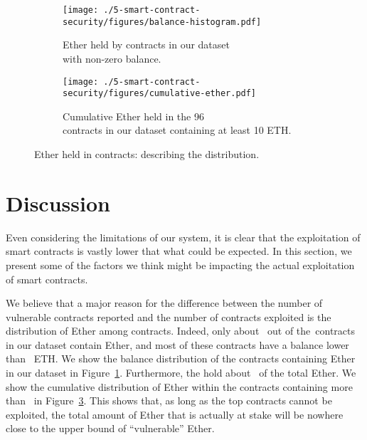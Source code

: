 \begin{figure}[tb]
  \centering
  \begin{subfigure}{.49\columnwidth}
    \centering
    \texttt{[image: ./5-smart-contract-security/figures/balance-histogram.pdf]}
    \caption{\scriptsize Ether held by contracts in our dataset\\with non-zero balance.}
    \label{fig:eth-held}
  \end{subfigure}
  \begin{subfigure}{.49\columnwidth}
    \centering
    \texttt{[image: ./5-smart-contract-security/figures/cumulative-ether.pdf]}
    \caption{\scriptsize Cumulative Ether held in the 96\\contracts in our dataset containing at least 10 ETH.}
    \label{fig:cumulative-eth}
  \end{subfigure}
  \caption{Ether held in contracts: describing the distribution.}
\end{figure}

\section{Discussion}
\label{sec:discussion}

Even considering the limitations of our system, it is clear that the exploitation of smart contracts is vastly lower that what could be expected. In this section, we present some of the factors we think might be impacting the actual exploitation of smart contracts.


We believe that a major reason for the difference between the number of vulnerable contracts reported and the number of contracts exploited is the distribution of Ether among contracts. Indeed, only about~ out of the~\VulnerableContracts contracts in our dataset contain Ether, and most of these contracts have a balance lower than~ ETH. We show the balance distribution of the contracts containing Ether in our dataset in Figure~\ref{fig:eth-held}. Furthermore, the  hold about~ of the total Ether. We show the cumulative distribution of Ether within the contracts containing more than~ in Figure~\ref{fig:cumulative-eth}. This shows that, as long as the top contracts cannot be exploited, the total amount of Ether that is actually at stake will be nowhere close to the upper bound of ``vulnerable'' Ether.

